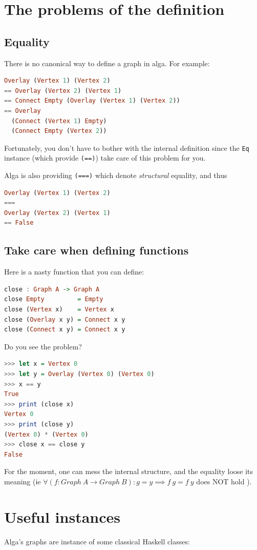 \documentclass[10pt,a4paper]{article}
\begin{document}
\section{The problems of the definition}
\subsection{Equality}
There is no canonical way to define a graph in alga. For example:
\begin{lstlisting}[language=Haskell, frame=single]
Overlay (Vertex 1) (Vertex 2)
== Overlay (Vertex 2) (Vertex 1)
== Connect Empty (Overlay (Vertex 1) (Vertex 2))
== Overlay
  (Connect (Vertex 1) Empty)
  (Connect Empty (Vertex 2))
\end{lstlisting}

Fortunately, you don't have to bother with the internal definition since the \verb|Eq| instance (which provide \verb|(==)|) take care of this problem for you.

Alga is also providing \verb|(===)| which denote \emph{structural} equality, and thus

\begin{lstlisting}[language=Haskell, frame=single]
Overlay (Vertex 1) (Vertex 2)
===
Overlay (Vertex 2) (Vertex 1)
== False
\end{lstlisting}

\subsection{Take care when defining functions}
Here is a nasty function that you can define:
\begin{lstlisting}[language=Haskell, frame=single]
close : Graph A -> Graph A
close Empty         = Empty
close (Vertex x)    = Vertex x
close (Overlay x y) = Connect x y
close (Connect x y) = Connect x y
\end{lstlisting}

Do you see the problem?
\begin{lstlisting}[language=Haskell, frame=single]
>>> let x = Vertex 0
>>> let y = Overlay (Vertex 0) (Vertex 0)
>>> x == y
True
>>> print (close x)
Vertex 0
>>> print (close y)
(Vertex 0) * (Vertex 0)
>>> close x == close y
False
\end{lstlisting}
For the moment, one can mess the internal structure, and the equality loose its meaning (ie $\forall (f: Graph \ A \to Graph \ B) : g = y \implies f \ g = f \ y$ does NOT hold ).

\section{Useful instances}
Alga's graphs are instance of some classical Haskell classes:
\end{document}
